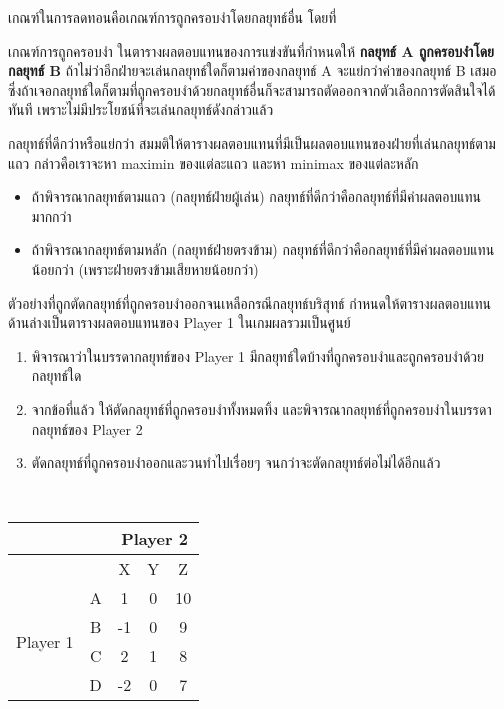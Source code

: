 เกณฑ์ในการลดทอนคือเกณฑ์การถูกครอบงำโดยกลยุทธ์อื่น โดยที่
\begin{definition}
	{เกณฑ์การถูกครอบงำ}{}
	ในตารางผลตอบแทนของการแข่งขันที่กำหนดให้ \textbf{กลยุทธ์ A ถูกครอบงำโดยกลยุทธ์ B} ถ้าไม่ว่าอีกฝ่ายจะเล่นกลยุทธ์ใดก็ตามค่าของกลยุทธ์ A จะแย่กว่าค่าของกลยุทธ์ B เสมอ ซึ่งถ้าเจอกลยุทธ์ใดก็ตามที่ถูกครอบงำด้วยกลยุทธ์อื่นก็จะสามารถตัดออกจากตัวเลือกการตัดสินใจได้ทันที เพราะไม่มีประโยชน์ที่จะเล่นกลยุทธ์ดังกล่าวแล้ว
\end{definition}
\begin{remark}
	{กลยุทธ์ที่ดีกว่าหรือแย่กว่า}{}
	สมมติให้ตารางผลตอบแทนที่มีเป็นผลตอบแทนของฝ่ายที่เล่นกลยุทธ์ตามแถว กล่าวคือเราจะหา maximin ของแต่ละแถว และหา minimax ของแต่ละหลัก
	\begin{itemize}
		\item ถ้าพิจารณากลยุทธ์ตามแถว (กลยุทธ์ฝ่ายผู้เล่น) กลยุทธ์ที่ดีกว่าคือกลยุทธ์ที่มีค่าผลตอบแทนมากกว่า
		\item ถ้าพิจารณากลยุทธ์ตามหลัก (กลยุทธ์ฝ่ายตรงข้าม) กลยุทธ์ที่ดีกว่าคือกลยุทธ์ที่มีค่าผลตอบแทนน้อยกว่า (เพราะฝ่ายตรงข้ามเสียหายน้อยกว่า)
	\end{itemize}
\end{remark}

\begin{example}
	{ตัวอย่างที่ถูกตัดกลยุทธ์ที่ถูกครอบงำออกจนเหลือกรณีกลยุทธ์บริสุทธ์}{}
	กำหนดให้ตารางผลตอบแทนด้านล่างเป็นตารางผลตอบแทนของ Player 1 ในเกมผลรวมเป็นศูนย์
	\begin{enumerate}
		\item พิจารณาว่าในบรรดากลยุทธ์ของ Player 1 มีกลยุทธ์ใดบ้างที่ถูกครอบงำและถูกครอบงำด้วยกลยุทธ์ใด
		\item จากข้อที่แล้ว ให้ตัดกลยุทธ์ที่ถูกครอบงำทั้งหมดทิ้ง และพิจารณากลยุทธ์ที่ถูกครอบงำในบรรดากลยุทธ์ของ Player 2
		\item ตัดกลยุทธ์ที่ถูกครอบงำออกและวนทำไปเรื่อยๆ จนกว่าจะตัดกลยุทธ์ต่อไม่ได้อีกแล้ว
	\end{enumerate}
	~\\
	\begin{tabular}{|c|c|ccc|}
		\hline
		&   & \multicolumn{3}{c|}{Player 2}                         \\ \hline
		&   & \multicolumn{1}{c|}{X}  & \multicolumn{1}{c|}{Y} & Z  \\ \hline
		\multirow{4}{*}{Player 1} & A & \multicolumn{1}{c|}{1}  & \multicolumn{1}{c|}{0} & 10 \\ \cline{2-5} 
		& B & \multicolumn{1}{c|}{-1} & \multicolumn{1}{c|}{0} & 9  \\ \cline{2-5} 
		& C & \multicolumn{1}{c|}{2}  & \multicolumn{1}{c|}{1} & 8  \\ \cline{2-5} 
		& D & \multicolumn{1}{c|}{-2} & \multicolumn{1}{c|}{0} & 7  \\ \hline
	\end{tabular}
\end{example}

